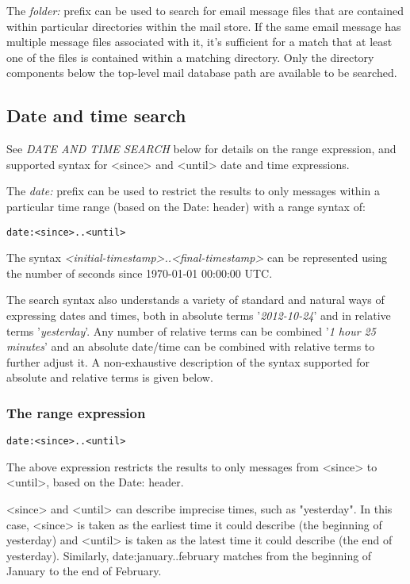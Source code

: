 \documentclass[a4,onecolumn,portrait]{article}
\begin{document}
The \emph{folder:} prefix can be used to search for email message files that are contained within particular directories within the mail store. If the same email message has multiple message files associated with it, it's sufficient for a match that at least one of the files is contained within a matching directory. Only the directory components below the top-level mail database path are available to be searched.

\subsection{Date and time search}
\label{sec-8-3}

See \emph{DATE AND TIME SEARCH} below for details on the range expression,
and supported syntax for <since> and <until> date and time expressions.

The \emph{date:} prefix can be used to restrict the results to only messages within a particular time range (based on the Date: header) with a range syntax of:

\begin{verbatim}
date:<since>..<until>
\end{verbatim}

The syntax \emph{<initial-timestamp>..<final-timestamp>} can be represented using the number of seconds since 1970-01-01 00:00:00 UTC.

The search syntax also understands a variety of standard and natural ways of expressing dates and times, both in absolute terms '\emph{2012-10-24}' and in relative terms '\emph{yesterday}'. Any number of relative terms can be combined '\emph{1 hour 25 minutes}' and an absolute date/time can be combined with relative terms to further adjust it. A non-exhaustive description of the syntax supported for absolute and relative terms is given below.

\subsubsection{The range expression}
\label{sec-8-3-1}

\begin{verbatim}
date:<since>..<until>
\end{verbatim}

The above expression restricts the results to only messages from <since> to <until>, based on the Date: header.

<since> and <until> can describe imprecise times, such as "yesterday". In this case, <since> is taken as the earliest time it could describe (the beginning of yesterday) and <until> is taken as the latest time it could describe (the end of yesterday).  Similarly, date:january..february matches from the beginning of January to the end of February.
\end{document}
